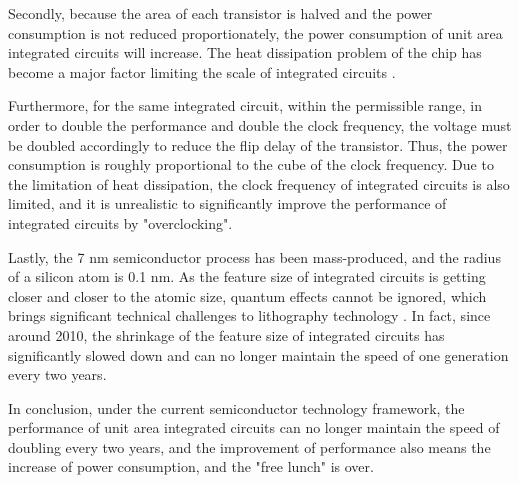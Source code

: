 Secondly, because the area of each transistor is halved and the power consumption is not reduced proportionately, the power consumption of unit area integrated circuits will increase. The heat dissipation problem of the chip has become a major factor limiting the scale of integrated circuits \cite{borkar2011future}. 

Furthermore, for the same integrated circuit, within the permissible range, in order to double the performance and double the clock frequency, the voltage must be doubled accordingly to reduce the flip delay of the transistor. Thus, the power consumption is roughly proportional to the cube of the clock frequency. Due to the limitation of heat dissipation, the clock frequency of integrated circuits is also limited, and it is unrealistic to significantly improve the performance of integrated circuits by "overclocking". 

Lastly, the 7 nm semiconductor process has been mass-produced, and the radius of a silicon atom is 0.1 nm. As the feature size of integrated circuits is getting closer and closer to the atomic size, quantum effects cannot be ignored, which brings significant technical challenges to lithography technology \cite{borkar2011future}. In fact, since around 2010, the shrinkage of the feature size of integrated circuits has significantly slowed down and can no longer maintain the speed of one generation every two years. 

In conclusion, under the current semiconductor technology framework, the performance of unit area integrated circuits can no longer maintain the speed of doubling every two years, and the improvement of performance also means the increase of power consumption, and the "free lunch" is over.

